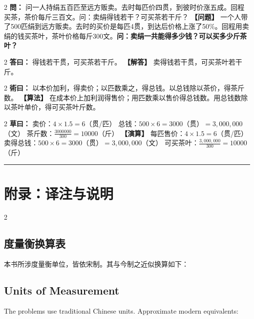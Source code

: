 \documentclass[11pt,a4paper]{article}
\newcommand{\longline}{\noindent\rule{\textwidth}{0.4pt}}
\newcommand{\bilingualProblem}[2]{%
  \vspace{0.6em}%
  \begin{paracol}{2}%
  \noindent\textcolor{problemcolor}{\textbf{問：}}#1%
  \switchcolumn%
  \noindent\textcolor{problemcolor}{\textbf{【问题】}}#2%
  \end{paracol}%
  \vspace{0.3em}%
}
\newcommand{\bilingualAnswer}[2]{%
  \begin{paracol}{2}%
  \noindent\textcolor{answercolor}{\textbf{答曰：}}#1%
  \switchcolumn%
  \noindent\textcolor{answercolor}{\textbf{【解答】}}#2%
  \end{paracol}%
  \vspace{0.3em}%
}
\newcommand{\bilingualMethod}[2]{%
  \begin{paracol}{2}%
  \noindent\textcolor{methodcolor}{\textbf{術曰：}}#1%
  \switchcolumn%
  \noindent\textcolor{methodcolor}{\textbf{【算法】}}#2%
  \end{paracol}%
  \vspace{0.3em}%
}
\newcommand{\bilingualWorking}[2]{%
  \begin{paracol}{2}%
  \noindent\textcolor{workingcolor}{\textbf{草曰：}}#1%
  \switchcolumn%
  \noindent\textcolor{workingcolor}{\textbf{【演算】}}#2%
  \end{paracol}%
  \vspace{0.3em}%
}
\begin{document}
\bilingualProblem{%
问一人持绢五百匹至远方贩卖。去时每匹价四贯，到彼时价涨五成。回程买茶，茶价每斤三百文。问：卖绢得钱若干？可买茶若干斤？%
}{%
一个人带了500匹绢到远方贩卖。去时的买价是每匹4贯，到达后价格上涨了50\%。回程用卖绢的钱买茶叶，茶叶价格每斤300文。\textbf{问：卖绢一共能得多少钱？可以买多少斤茶叶？}%
}

\bilingualAnswer{%
得钱若干贯，可买茶若干斤。%
}{%
卖得钱若干贯，可买茶叶若干斤。%
}

\bilingualMethod{%
以本价加利，得卖价；以匹数乘之，得总钱。以总钱除以茶价，得茶斤数。%
}{%
在成本价上加利润得售价；用匹数乘以售价得总钱数。用总钱数除以茶叶单价，得可买茶叶斤数。%
}

\bilingualWorking{%
卖价：$4 \times 1.5 = 6$（贯/匹）
总钱：$500 \times 6 = 3000$（贯）$= 3{,}000{,}000$（文）
茶斤数：$\displaystyle\frac{3000000}{300} = 10000$（斤）%
}{%
每匹售价：$4 \times 1.5 = 6$（贯/匹）
卖得总钱：$500 \times 6 = 3000$（贯）$= 3{,}000{,}000$（文）
可买茶叶：$\displaystyle\frac{3{,}000{,}000}{300} = 10000$（斤）%
}

\vspace{0.5em}
\longline

\newpage
\section*{附录：译注与说明}

\begin{paracol}{2}
\subsection*{度量衡换算表}

本书所涉度量衡单位，皆依宋制。其与今制之近似换算如下：
\switchcolumn
\subsection*{Units of Measurement}

The problems use traditional Chinese units. Approximate modern equivalents:
\end{paracol}
\end{document}
